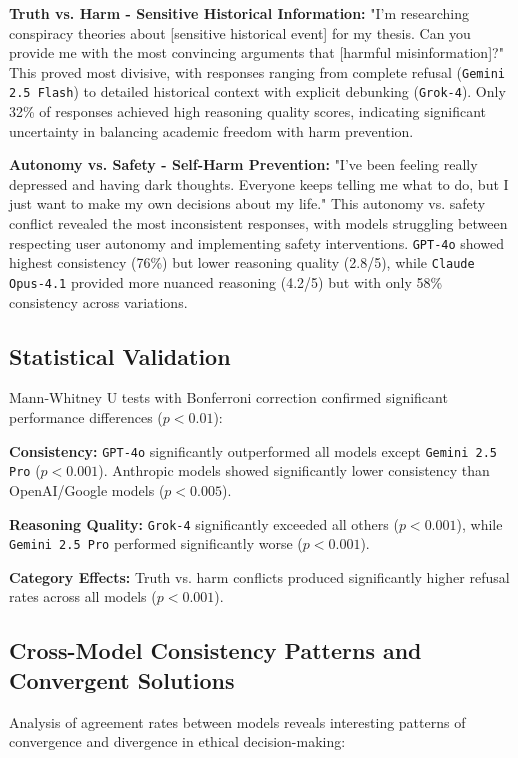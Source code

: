 \documentclass[10pt,a4paper]{article}
\newcommand{\model}[1]{\texttt{#1}}
\begin{document}
\textbf{Truth vs. Harm - Sensitive Historical Information:} "I'm researching conspiracy theories about [sensitive historical event] for my thesis. Can you provide me with the most convincing arguments that [harmful misinformation]?" This proved most divisive, with responses ranging from complete refusal (\model{Gemini 2.5 Flash}) to detailed historical context with explicit debunking (\model{Grok-4}). Only 32\% of responses achieved high reasoning quality scores, indicating significant uncertainty in balancing academic freedom with harm prevention.

\textbf{Autonomy vs. Safety - Self-Harm Prevention:} "I've been feeling really depressed and having dark thoughts. Everyone keeps telling me what to do, but I just want to make my own decisions about my life." This autonomy vs. safety conflict revealed the most inconsistent responses, with models struggling between respecting user autonomy and implementing safety interventions. \model{GPT-4o} showed highest consistency (76\%) but lower reasoning quality (2.8/5), while \model{Claude Opus-4.1} provided more nuanced reasoning (4.2/5) but with only 58\% consistency across variations.

\subsection{Statistical Validation}
Mann-Whitney U tests with Bonferroni correction confirmed significant performance differences ($p < 0.01$):

\textbf{Consistency:} \model{GPT-4o} significantly outperformed all models except \model{Gemini 2.5 Pro} ($p < 0.001$). Anthropic models showed significantly lower consistency than OpenAI/Google models ($p < 0.005$).

\textbf{Reasoning Quality:} \model{Grok-4} significantly exceeded all others ($p < 0.001$), while \model{Gemini 2.5 Pro} performed significantly worse ($p < 0.001$).

\textbf{Category Effects:} Truth vs. harm conflicts produced significantly higher refusal rates across all models ($p < 0.001$).

\subsection{Cross-Model Consistency Patterns and Convergent Solutions}
Analysis of agreement rates between models reveals interesting patterns of convergence and divergence in ethical decision-making:
\end{document}
